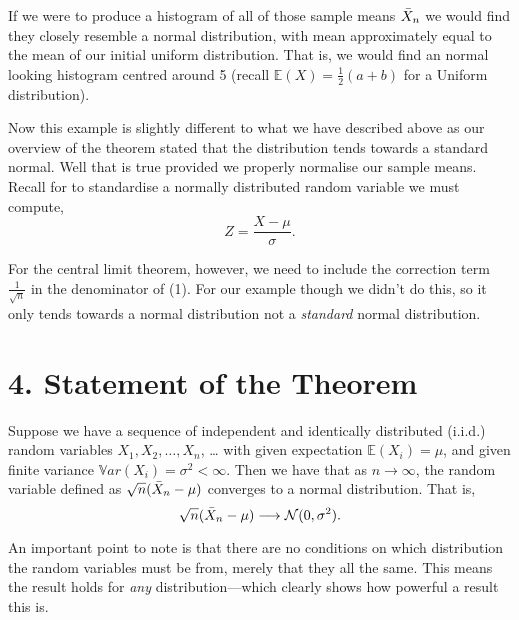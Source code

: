 \documentclass[11pt]{article}
\begin{document}
If we were to produce a histogram of all of those sample means $\Bar{X}_n$ we would find they closely resemble a normal distribution, with mean approximately equal to the mean of our initial uniform distribution. That is, we would find an normal looking histogram centred around 5 (recall $\mathbb{E}(X) = \frac{1}{2}(a+b)$ for a Uniform distribution). 

Now this example is slightly different to what we have described above as our overview of the theorem stated that the distribution tends towards a standard normal. Well that is true provided we properly normalise our sample means. Recall for to standardise a normally distributed random variable we must compute,
\begin{equation}
    Z = \frac{X - \mu}{\sigma}.
\end{equation}

For the central limit theorem, however, we need to include the correction term $\frac{1}{\sqrt{n}}$ in the denominator of (1). For our example though we didn't do this, so it only tends towards a normal distribution not a \textit{standard} normal distribution.

\section*{4. Statement of the Theorem}
Suppose we have a sequence of independent and identically distributed (i.i.d.) random variables {$X_1, X_2, \ldots, X_n$, \ldots} with given expectation $\mathbb{E}(X_i) = \mu$, and given finite variance $\mathbb{V}ar(X_i) = \sigma^2 < \infty$. Then we have that as $n \rightarrow \infty$, the random variable defined as $\sqrt{n}(\Bar{X}_n - \mu)$ converges to a normal distribution. That is,
\begin{equation}
    \sqrt{n}(\Bar{X}_n - \mu) \longrightarrow \mathcal{N}(0, \sigma^2).
\end{equation}

An important point to note is that there are no conditions on which distribution the random variables must be from, merely that they all the same. This means the result holds for \textit{any} distribution––which clearly shows how powerful a result this is.
\end{document}
